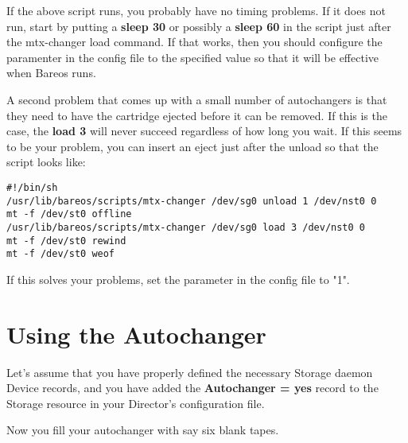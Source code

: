 If the above script runs, you probably have no timing problems. If it does not
run, start by putting a {\bf sleep 30} or possibly a {\bf sleep 60} in the
script just after the mtx-changer load command. If that works, then you should
configure the  paramenter in the config file  to the specified value  so that it will be
effective when Bareos runs.

A second problem that comes up with a small number of autochangers is that
they need to have the cartridge ejected before it can be removed. If this is
the case, the {\bf load 3} will never succeed regardless of how long you wait.
If this seems to be your problem, you can insert an eject just after the
unload so that the script looks like:

\footnotesize
\begin{verbatim}
#!/bin/sh
/usr/lib/bareos/scripts/mtx-changer /dev/sg0 unload 1 /dev/nst0 0
mt -f /dev/st0 offline
/usr/lib/bareos/scripts/mtx-changer /dev/sg0 load 3 /dev/nst0 0
mt -f /dev/st0 rewind
mt -f /dev/st0 weof
\end{verbatim}
\normalsize

If this solves your problems, set the parameter  in the config file  to "1".





\section{Using the Autochanger}
\label{using}

Let's assume that you have properly defined the necessary Storage daemon
Device records, and you have added the {\bf Autochanger = yes} record to the
Storage resource in your Director's configuration file.

Now you fill your autochanger with say six blank tapes.

